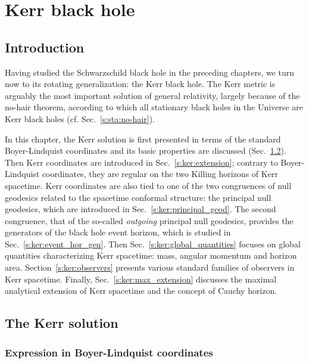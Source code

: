 \chapter{Kerr black hole}
\label{s:ker}

\minitoc

\section{Introduction}

Having studied the Schwarzschild black hole in the preceding
chapters, we turn now to its rotating generalization: the Kerr black hole.
The Kerr metric is arguably the most important solution of general relativity,
largely because of the no-hair theorem, according to which
all stationary black holes in the Universe are Kerr black holes (cf. Sec.~\ref{s:sta:no-hair}).

In this chapter, the Kerr solution is first presented in terms of
the standard Boyer-Lindquist coordinates and its basic properties are
discussed (Sec.~\ref{s:ker:Kerr_solution}). Then Kerr coordinates are introduced
in Sec.~\ref{s:ker:extension}; contrary to Boyer-Lindquist coordinates,
they are regular on the two Killing horizons of Kerr spacetime.
Kerr coordinates are also tied to one of the two congruences of
null geodesics related to the spacetime conformal structure: the
principal null geodesics, which are introduced in Sec.~\ref{s:ker:principal_geod}.
The second congruence, that of the so-called \emph{outgoing} principal null geodesics,
provides the generators of the black hole event horizon, which is
studied in Sec.~\ref{s:ker:event_hor_gen}.
Then Sec.~\ref{s:ker:global_quantities}
focuses on global quantities characterizing Kerr spacetime: mass, angular
momentum and horizon area.
Section~\ref{s:ker:observers} presents various standard families of observers in
Kerr spacetime.
Finally, Sec.~\ref{s:ker:max_extension} discusses the maximal analytical extension of Kerr spacetime
and the concept of Cauchy horizon.


\section{The Kerr solution} \label{s:ker:Kerr_solution}

\subsection{Expression in Boyer-Lindquist coordinates} \label{s:ker:expr_BL}

